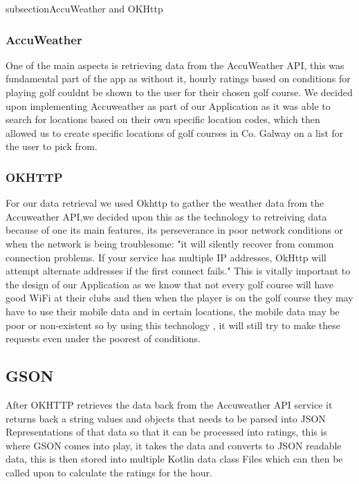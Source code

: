 subsection{AccuWeather and OKHttp}
\subsubsection{AccuWeather}
One of the main aspects is retrieving data from the AccuWeather API, this was fundamental part of the app as without it, hourly ratings based on conditions for playing golf couldnt be shown to the user for their chosen golf course. We decided upon implementing Accuweather as part of our Application as it was able to search for locations based on their own specific location codes, which then allowed us to create specific locations of golf courses in Co. Galway on a list for the user to pick from.

\subsubsection{OKHTTP}
For our data retrieval we used Okhttp to gather the weather data from the Accuweather API,we decided upon this as the technology to retreiving data because of one its main features, its perseverance in poor network conditions or when the network is being troublesome: "it will silently recover from common connection problems. If your service has multiple IP addresses, OkHttp will attempt alternate addresses if the first connect fails."\cite{ref1}
\newline
\newline
This is vitally important to the design of our Application as we know that not every golf course will have good WiFi at their clubs and then when the player is on the golf course they may have to use their mobile data and in certain locations, the mobile data may be poor or non-existent so by using this technology , it will still try to make these requests even under the poorest of conditions.

\subsection{GSON}
After OKHTTP retrieves the data back from the Accuweather API service it returns back a string values and objects that needs to be parsed into JSON Representations of that data so that it can be processed into ratings, this is where GSON comes into play, it takes the data and converts to JSON readable data, this is then stored into multiple Kotlin data class Files which can then be called upon to calculate the ratings for the hour.
